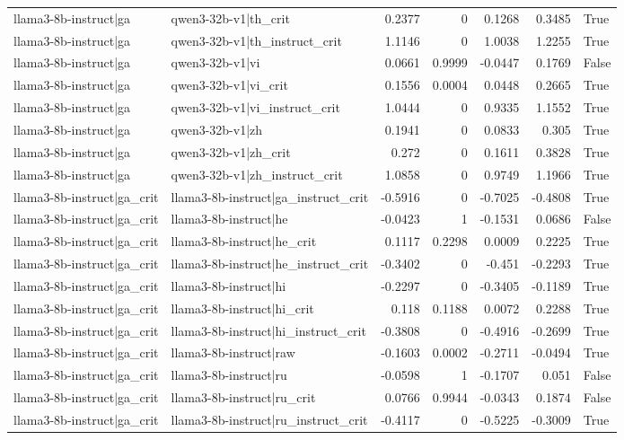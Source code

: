 \begin{table}
\begin{tabular}{l l r r r r l}
llama3-8b-instruct|ga & qwen3-32b-v1|th_crit & 0.2377 & 0 & 0.1268 & 0.3485 & True \\
llama3-8b-instruct|ga & qwen3-32b-v1|th_instruct_crit & 1.1146 & 0 & 1.0038 & 1.2255 & True \\
llama3-8b-instruct|ga & qwen3-32b-v1|vi & 0.0661 & 0.9999 & -0.0447 & 0.1769 & False \\
llama3-8b-instruct|ga & qwen3-32b-v1|vi_crit & 0.1556 & 0.0004 & 0.0448 & 0.2665 & True \\
llama3-8b-instruct|ga & qwen3-32b-v1|vi_instruct_crit & 1.0444 & 0 & 0.9335 & 1.1552 & True \\
llama3-8b-instruct|ga & qwen3-32b-v1|zh & 0.1941 & 0 & 0.0833 & 0.305 & True \\
llama3-8b-instruct|ga & qwen3-32b-v1|zh_crit & 0.272 & 0 & 0.1611 & 0.3828 & True \\
llama3-8b-instruct|ga & qwen3-32b-v1|zh_instruct_crit & 1.0858 & 0 & 0.9749 & 1.1966 & True \\
llama3-8b-instruct|ga_crit & llama3-8b-instruct|ga_instruct_crit & -0.5916 & 0 & -0.7025 & -0.4808 & True \\
llama3-8b-instruct|ga_crit & llama3-8b-instruct|he & -0.0423 & 1 & -0.1531 & 0.0686 & False \\
llama3-8b-instruct|ga_crit & llama3-8b-instruct|he_crit & 0.1117 & 0.2298 & 0.0009 & 0.2225 & True \\
llama3-8b-instruct|ga_crit & llama3-8b-instruct|he_instruct_crit & -0.3402 & 0 & -0.451 & -0.2293 & True \\
llama3-8b-instruct|ga_crit & llama3-8b-instruct|hi & -0.2297 & 0 & -0.3405 & -0.1189 & True \\
llama3-8b-instruct|ga_crit & llama3-8b-instruct|hi_crit & 0.118 & 0.1188 & 0.0072 & 0.2288 & True \\
llama3-8b-instruct|ga_crit & llama3-8b-instruct|hi_instruct_crit & -0.3808 & 0 & -0.4916 & -0.2699 & True \\
llama3-8b-instruct|ga_crit & llama3-8b-instruct|raw & -0.1603 & 0.0002 & -0.2711 & -0.0494 & True \\
llama3-8b-instruct|ga_crit & llama3-8b-instruct|ru & -0.0598 & 1 & -0.1707 & 0.051 & False \\
llama3-8b-instruct|ga_crit & llama3-8b-instruct|ru_crit & 0.0766 & 0.9944 & -0.0343 & 0.1874 & False \\
llama3-8b-instruct|ga_crit & llama3-8b-instruct|ru_instruct_crit & -0.4117 & 0 & -0.5225 & -0.3009 & True \\

\end{tabular}
\end{table}
